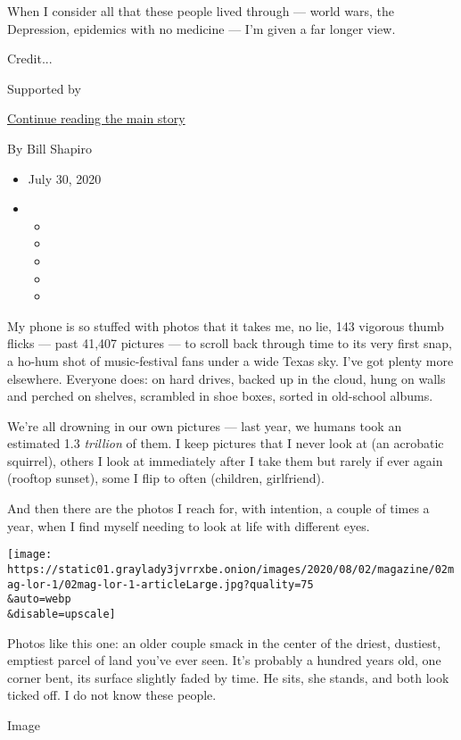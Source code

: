 When I consider all that these people lived through --- world wars, the
Depression, epidemics with no medicine --- I'm given a far longer view.

Credit...

Supported by

\protect\hyperlink{after-sponsor}{Continue reading the main story}

By Bill Shapiro

\begin{itemize}
\item
  July 30, 2020
\item
  \begin{itemize}
  \item
  \item
  \item
  \item
  \item
  \end{itemize}
\end{itemize}

My phone is so stuffed with photos that it takes me, no lie, 143
vigorous thumb flicks --- past 41,407 pictures --- to scroll back
through time to its very first snap, a ho-hum shot of music-festival
fans under a wide Texas sky. I've got plenty more elsewhere. Everyone
does: on hard drives, backed up in the cloud, hung on walls and perched
on shelves, scrambled in shoe boxes, sorted in old-school albums.

We're all drowning in our own pictures --- last year, we humans took an
estimated 1.3 \emph{trillion} of them. I keep pictures that I never look
at (an acrobatic squirrel), others I look at immediately after I take
them but rarely if ever again (rooftop sunset), some I flip to often
(children, girlfriend).

And then there are the photos I reach for, with intention, a couple of
times a year, when I find myself needing to look at life with different
eyes.

\texttt{[image: https://static01.graylady3jvrrxbe.onion/images/2020/08/02/magazine/02mag-lor-1/02mag-lor-1-articleLarge.jpg?quality=75\\\&auto=webp\\\&disable=upscale]}

Photos like this one: an older couple smack in the center of the driest,
dustiest, emptiest parcel of land you've ever seen. It's probably a
hundred years old, one corner bent, its surface slightly faded by time.
He sits, she stands, and both look ticked off. I do not know these
people.

Image

